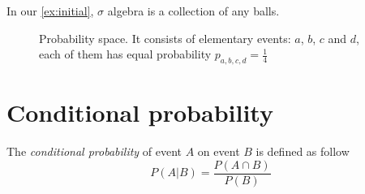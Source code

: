 In our \cref{ex:initial}, $\sigma$ algebra is a collection of any
balls. 

\begin{figure}
  \centering
  \caption{Probability space. It consists of elementary events: $a$,
    $b$, $c$ and $d$, each
    of them has equal probability $p_{a,b,c,d} = \frac{1}{4}$}
  \label{fig:probabilityspace}
\end{figure}

\section{Conditional probability}

\begin{definition}
\label{def:conditionalprobability}
The \textit{conditional probability} of event $A$ on event $B$ is
defined as follow
\[
P(A|B) = \frac{P\left(A \cap B\right)}{P(B)}
\]
\end{definition}

